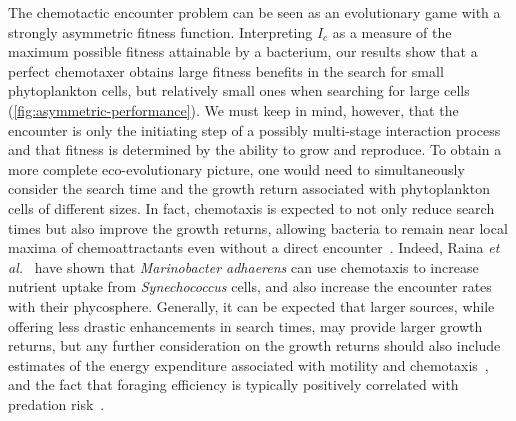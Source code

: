 \documentclass[9pt,twocolumn,twoside]{pnas-new}
\begin{document}
The chemotactic encounter problem can be seen as an evolutionary game with a strongly asymmetric fitness function.
Interpreting $I_c$ as a measure of the maximum possible fitness attainable by a bacterium, our results show that a perfect chemotaxer obtains large fitness benefits in the search for small phytoplankton cells, but relatively small ones when searching for large cells (\autoref{fig:asymmetric-performance}). 
We must keep in mind, however, that the encounter is only the initiating step of a possibly multi-stage interaction process and that fitness is determined by the ability to grow and reproduce.
To obtain a more complete eco-evolutionary picture, one would need to simultaneously consider the search time and the growth return associated with phytoplankton cells of different sizes.
In fact, chemotaxis is expected to not only reduce search times but also improve the growth returns, allowing bacteria to remain near local maxima of chemoattractants even without a direct encounter~\cite{fernandez2019foraging}.
Indeed, Raina \textit{et al.}~\cite{raina2023chemotaxis} have shown that \textit{Marinobacter adhaerens} can use chemotaxis to increase nutrient uptake from \textit{Synechococcus} cells, and also increase the encounter rates with their phycosphere.
Generally, it can be expected that larger sources, while offering less drastic enhancements in search times, may provide larger growth returns, but any further consideration on the growth returns should also include estimates of the energy expenditure associated with motility and chemotaxis~\cite{malaguti2021theory,keegstra2022ecological}, and the fact that foraging efficiency is typically positively correlated with predation risk~\cite{nielsen2021foraging,ebrahimi2022particle}.
\end{document}
